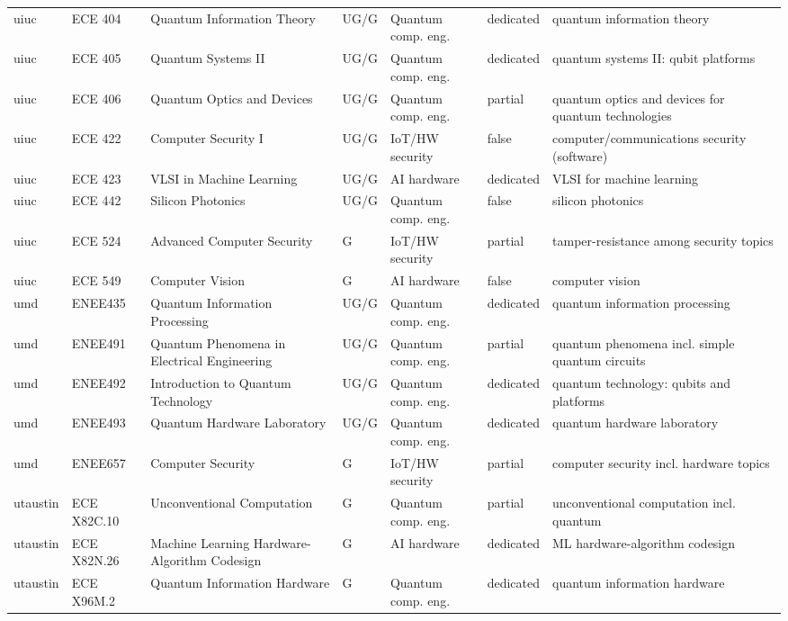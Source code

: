 \documentclass[10pt]{article}
\begin{document}
\begin{longtable}{@{}llL{4.6cm}llll@{}}
uiuc & ECE 404 & Quantum Information Theory & UG/G & Quantum comp. eng. & dedicated & quantum information theory \\
uiuc & ECE 405 & Quantum Systems II & UG/G & Quantum comp. eng. & dedicated & quantum systems II: qubit platforms \\
uiuc & ECE 406 & Quantum Optics and Devices & UG/G & Quantum comp. eng. & partial & quantum optics and devices for quantum technologies \\
uiuc & ECE 422 & Computer Security I & UG/G & IoT/HW security & false & computer/communications security (software) \\
uiuc & ECE 423 & VLSI in Machine Learning & UG/G & AI hardware & dedicated & VLSI for machine learning \\
uiuc & ECE 442 & Silicon Photonics & UG/G & Quantum comp. eng. & false & silicon photonics \\
uiuc & ECE 524 & Advanced Computer Security & G & IoT/HW security & partial & tamper-resistance among security topics \\
uiuc & ECE 549 & Computer Vision & G & AI hardware & false & computer vision \\
umd & ENEE435 & Quantum Information Processing & UG/G & Quantum comp. eng. & dedicated & quantum information processing \\
umd & ENEE491 & Quantum Phenomena in Electrical Engineering & UG/G & Quantum comp. eng. & partial & quantum phenomena incl. simple quantum circuits \\
umd & ENEE492 & Introduction to Quantum Technology & UG/G & Quantum comp. eng. & dedicated & quantum technology: qubits and platforms \\
umd & ENEE493 & Quantum Hardware Laboratory & UG/G & Quantum comp. eng. & dedicated & quantum hardware laboratory \\
umd & ENEE657 & Computer Security & G & IoT/HW security & partial & computer security incl. hardware topics \\
utaustin & ECE X82C.10 & Unconventional Computation & G & Quantum comp. eng. & partial & unconventional computation incl. quantum \\
utaustin & ECE X82N.26 & Machine Learning Hardware-Algorithm Codesign & G & AI hardware & dedicated & ML hardware-algorithm codesign \\
utaustin & ECE X96M.2 & Quantum Information Hardware & G & Quantum comp. eng. & dedicated & quantum information hardware \\
\end{longtable}
\end{document}
